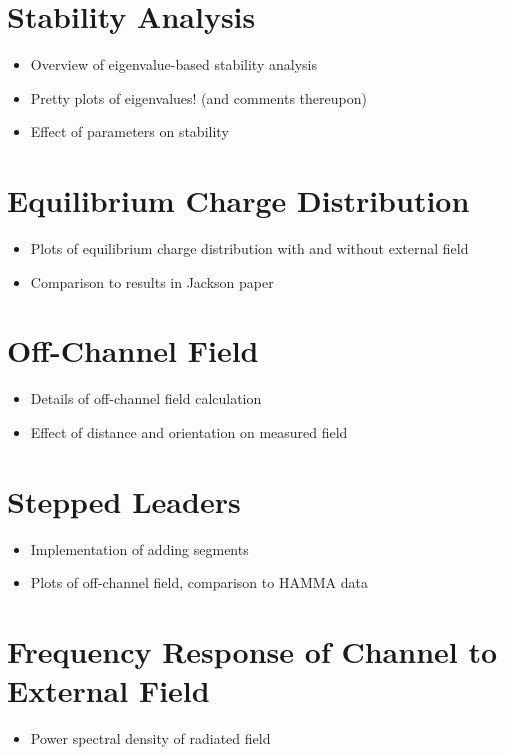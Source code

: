 \documentclass{article}
\begin{document}
\section{Stability Analysis}
\begin{itemize}
\item Overview of eigenvalue-based stability analysis
\item Pretty plots of eigenvalues! (and comments thereupon)
\item Effect of parameters on stability
\end{itemize}

\section{Equilibrium Charge Distribution}
\begin{itemize}
\item Plots of equilibrium charge distribution with and without external field
\item Comparison to results in Jackson paper
\end{itemize}

\section{Off-Channel Field}
\begin{itemize}
\item Details of off-channel field calculation
\item Effect of distance and orientation on measured field
\end{itemize}

\section{Stepped Leaders}
\begin{itemize}
\item Implementation of adding segments
\item Plots of off-channel field, comparison to HAMMA data
\end{itemize}

\section{Frequency Response of Channel to External Field}
\begin{itemize}
\item Power spectral density of radiated field
\end{itemize}
\end{document}
